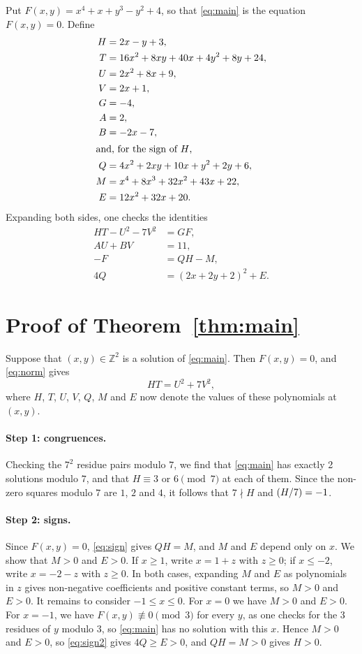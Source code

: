\documentclass[11pt]{article}
\newcommand{\Z}{\mathbb{Z}}
\newcommand{\leg}[2]{\mathchoice{\biggl(\dfrac{#1}{#2}\biggr)}{(#1/#2)}{(#1/#2)}{(#1/#2)}}
\begin{document}
Put $F(x,y)=x^{4}+x+y^{3}-y^{2}+4$, so that \eqref{eq:main} is the equation $F(x,y)=0$. Define
\begin{align*}
H&=2x-y+3,\\
T&=16x^{2}+8xy+40x+4y^{2}+8y+24,\\
U&=2x^{2}+8x+9,\\
V&=2x+1,\\
G&=-4,\\
A&=2,\\
B&=-2x-7,\\
\intertext{and, for the sign of $H$,}
Q&=4x^{2}+2xy+10x+y^{2}+2y+6,\\
M&=x^{4}+8x^{3}+32x^{2}+43x+22,\\
E&=12x^{2}+32x+20.
\end{align*}
Expanding both sides, one checks the identities
\begin{align}
HT-U^2-7V^2&=GF,\label{eq:norm}\\
AU+BV&=11,\label{eq:bezout}\\
-F&=QH-M,\label{eq:sign}\\
4Q&=(2x+2y+2)^2+E.\label{eq:sign2}
\end{align}

\section{Proof of Theorem~\ref{thm:main}}

Suppose that $(x,y)\in\Z^2$ is a solution of \eqref{eq:main}. Then $F(x,y)=0$, and \eqref{eq:norm} gives
\begin{equation}\label{eq:HT}
HT=U^2+7V^2,
\end{equation}
where $H$, $T$, $U$, $V$, $Q$, $M$ and $E$ now denote the values of these polynomials at $(x,y)$.

\paragraph{Step 1: congruences.} Checking the $7^2$ residue pairs modulo $7$, we find that \eqref{eq:main} has exactly 2 solutions modulo $7$, and that $H\equiv3\text{ or }6\pmod{7}$ at each of them. Since the non-zero squares modulo $7$ are $1$, $2$ and $4$, it follows that $7\nmid H$ and $\leg{H}{7}=-1$.

\paragraph{Step 2: signs.} Since $F(x,y)=0$, \eqref{eq:sign} gives $QH=M$, and $M$ and $E$ depend only on $x$. We show that $M>0$ and $E>0$. If $x\geq1$, write $x=1+z$ with $z\geq0$; if $x\leq-2$, write $x=-2-z$ with $z\geq0$. In both cases, expanding $M$ and $E$ as polynomials in $z$ gives non-negative coefficients and positive constant terms, so $M>0$ and $E>0$. It remains to consider $-1\leq x\leq0$. For $x=0$ we have $M>0$ and $E>0$. For $x=-1$, we have $F(x,y)\not\equiv0\pmod{3}$ for every $y$, as one checks for the 3 residues of $y$ modulo $3$, so \eqref{eq:main} has no solution with this $x$. Hence $M>0$ and $E>0$, so \eqref{eq:sign2} gives $4Q\geq E>0$, and $QH=M>0$ gives $H>0$.
\end{document}
